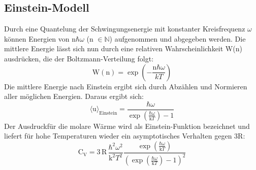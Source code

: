 \subsection{Einstein-Modell}
\label{sec:Einstein-Modell}
Durch eine Quantelung der Schwingungsenergie mit konstanter Kreisfrequenz $\omega$
können Energien von n$\hbar\omega$ (n $\in \mathds{N}$) aufgenommen und abgegeben werden.
Die mittlere Energie lässt sich nun durch eine relativen Wahrscheinlichkeit W(n)
ausdrücken, die der Boltzmann-Verteilung folgt:
\begin{equation}
  \text{W}(\text{n}) = \exp{\left(-\frac{\text{n}\hbar\omega}{kT}\right)}
\end{equation}
Die mittlere Energie nach Einstein ergibt sich durch Abzählen und Normieren aller möglichen Energien. Daraus ergibt sich:
\begin{equation}
  \langle \text{u} \rangle_\text{Einstein} = \frac{\hbar\omega}{\exp{\left(\frac{\hbar\omega}{\text{k}T}\right)}-1}
\end{equation}
Der Ausdruckfür die molare Wärme wird als Einstein-Funktion bezeichnet
und liefert für hohe Temperaturen wieder ein asymptotisches Verhalten gegen 3R:
\begin{equation}
  \text{C}_\text{V} = 3\,\text{R}\,\frac{\hbar^2\omega^2}{\text{k}^2T^2}\frac{\exp{\left(\frac{\hbar\omega}{\text{k}T}\right)}}{(\exp{\left(\frac{\hbar\omega}{\text{k}T}\right)}-1)^2}
\end{equation}


